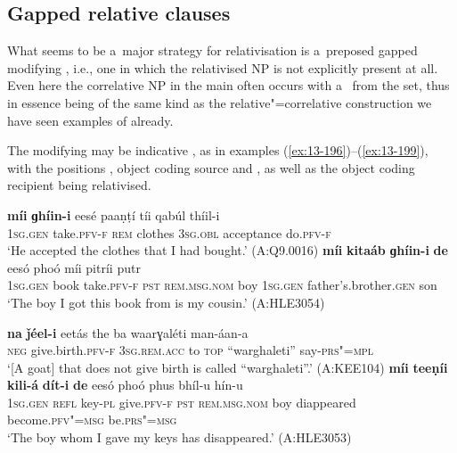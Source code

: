 \subsection{Gapped relative clauses}
\label{subsec:13-6-3}


What seems to be a~major strategy for relativisation is a~preposed gapped modifying , i.e., one in which the relativised NP is not explicitly present at all. Even here the correlative NP in the main  often occurs with a~ from the  set, thus in essence being of the same kind as the relative"=correlative construction we have seen examples of already.


The modifying  may be indicative , as in examples (\ref{ex:13-196})--(\ref{ex:13-199}), with the positions ,  object coding source and  , as well as the  object coding recipient being relativised.

\ea
\label{ex:13-196}
\gll \textbf{míi} \textbf{ɡhíin-i} eesé paaṇṭí tíi qabúl  thíil-i \\
\textsc{1sg.gen} take.\textsc{pfv-f} \textsc{rem} clothes \textsc{3sg.obl} acceptance do.\textsc{pfv-f} \\
\glt `He accepted the clothes that I had bought.' (A:Q9.0016) 
\ex
\label{ex:13-197}
\gll \textbf{míi} \textbf{kitaáb} \textbf{ɡhíin-i} \textbf{de} eesó phoó míi pitríi putr\\
\textsc{1sg.gen} book take.\textsc{pfv-f} \textsc{pst} \textsc{rem.msg.nom} boy  \textsc{1sg.gen} father's.brother.\textsc{gen} son\\
\glt `The boy I got this book from is my cousin.' (A:HLE3054)

\ex
\label{ex:13-198}
\gll \textbf{na} \textbf{ǰéel-i} eetás the ba  waarɣaléti man-áan-a \\
\textsc{neg} give.birth.\textsc{pfv-f} \textsc{3sg.rem.acc} to \textsc{top} ``warghaleti'' say-\textsc{prs"=mpl} \\
\glt `[A goat] that does not give birth is called ``warghaleti''.' (A:KEE104) 
\ex
\label{ex:13-199}
\gll \textbf{míi} \textbf{teeṇíi} \textbf{kili-á} \textbf{dít-i} \textbf{de} eesó phoó phus bhíl-u hín-u\\
\textsc{1sg.gen} \textsc{refl} key-\textsc{pl} give.\textsc{pfv-f} \textsc{pst} \textsc{rem.msg.nom} boy diappeared become.\textsc{pfv"=msg} be.\textsc{prs"=msg}\\
\glt `The boy whom I gave my keys has disappeared.' (A:HLE3053) 
\z

